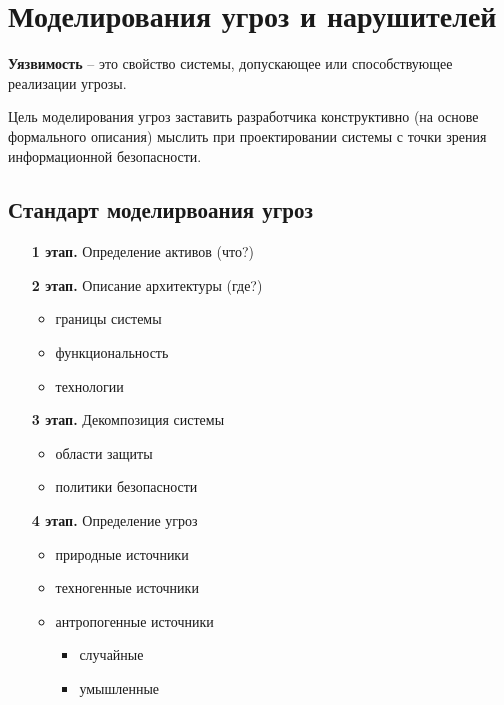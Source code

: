 \section{Моделирования угроз и нарушителей}

\textbf{Уязвимость} -- это свойство системы, допускающее или способствующее реализации угрозы.

Цель моделирования угроз заставить разработчика конструктивно (на основе формального описания) мыслить при проектировании системы с точки зрения информационной безопасности.

\subsection{Стандарт моделирвоания угроз}

\begin{enumerate}
    \item[\textbf{1 этап.}] Определение активов (что?)
    \item[\textbf{2 этап.}] Описание архитектуры (где?)

        \begin{itemize}
            \item границы системы
            \item функциональность
            \item технологии
        \end{itemize}

    \item [\textbf{3 этап.}] Декомпозиция системы

        \begin{itemize}
            \item области защиты
            \item политики безопасности
        \end{itemize}

    \item[\textbf{4 этап.}] Определение угроз

        \begin{itemize}
            \item природные источники
            \item техногенные источники
            \item антропогенные источники
                \begin{itemize}
                    \item случайные
                    \item умышленные
                \end{itemize}
        \end{itemize}


\end{enumerate}
